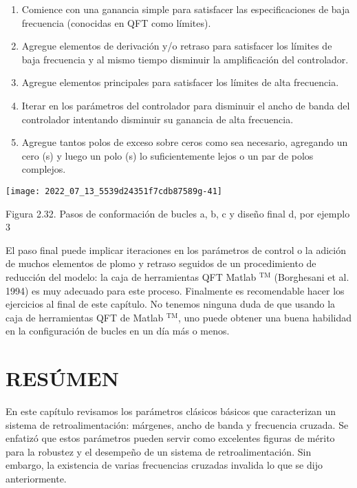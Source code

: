 \begin{enumerate}
  \item Comience con una ganancia simple para satisfacer las especificaciones de baja frecuencia (conocidas en QFT como límites).

  \item Agregue elementos de derivación y/o retraso para satisfacer los límites de baja frecuencia y al mismo tiempo disminuir la amplificación del controlador.

  \item Agregue elementos principales para satisfacer los límites de alta frecuencia.

  \item Iterar en los parámetros del controlador para disminuir el ancho de banda del controlador intentando disminuir su ganancia de alta frecuencia.

  \item Agregue tantos polos de exceso sobre ceros como sea necesario, agregando un cero (s) y luego un polo (s) lo suficientemente lejos o un par de polos complejos.

\end{enumerate}
\texttt{[image: 2022\_07\_13\_5539d24351f7cdb87589g-41]}

Figura 2.32. Pasos de conformación de bucles a, b, c y diseño final d, por ejemplo 3

El paso final puede implicar iteraciones en los parámetros de control o la adición de muchos elementos de plomo y retraso seguidos de un procedimiento de reducción del modelo: la caja de herramientas QFT Matlab ${ }^{\mathrm{TM}}$ (Borghesani et al. 1994) es muy adecuado para este proceso. Finalmente es recomendable hacer los ejercicios al final de este capítulo. No tenemos ninguna duda de que usando la caja de herramientas QFT de Matlab ${ }^{\mathrm{TM}}$, uno puede obtener una buena habilidad en la configuración de bucles en un día más o menos.

\section{RESÚMEN}
En este capítulo revisamos los parámetros clásicos básicos que caracterizan un sistema de retroalimentación: márgenes, ancho de banda y frecuencia cruzada. Se enfatizó que estos parámetros pueden servir como excelentes figuras de mérito para la robustez y el desempeño de un sistema de retroalimentación. Sin embargo, la existencia de varias frecuencias cruzadas invalida lo que se dijo anteriormente.


